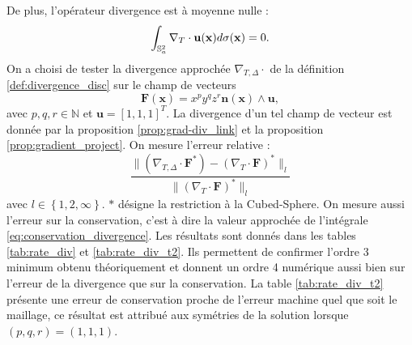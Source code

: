 De plus, l'opérateur divergence est à moyenne nulle :
\begin{equation}
\displaystyle\int_{\mathbb{S}_a^2} \nabla_T \cdot \mathbf{u} ( \mathbf{x} ) d \sigma ( \mathbf{x} ) = 0.
\label{eq:conservation_divergence}
\end{equation}
On a choisi de tester la divergence approchée $\nabla_{T,\Delta} \cdot$ de la définition \ref{def:divergence_disc} sur le champ de vecteurs 
\begin{equation}
\mathbf{F}(\mathbf{x}) = x^p y^q z^r \mathbf{n}(\mathbf{x}) \wedge \mathbf{u},
\label{eq:test_divergence}
\end{equation}
avec $p,q,r \in \mathbb{N}$ et $\mathbf{u} = [1, 1, 1]^T$. La divergence d'un tel champ de vecteur est donnée par la proposition \ref{prop:grad-div_link} et la proposition \ref{prop:gradient_project}. 
On mesure l'erreur relative : 
\begin{equation}
\dfrac{\| \left(\nabla_{T,\Delta} \cdot \mathbf{F}^* \right) - \left( \nabla_{T} \cdot \mathbf{F}\right)^* \|_l}{\| \left( \nabla_{T} \cdot \mathbf{F} \right)^* \|_l}
\end{equation}
avec $l \in \left\lbrace 1, 2, \infty \right\rbrace$. $*$ désigne la restriction à la Cubed-Sphere.
On mesure aussi l'erreur sur la conservation, c'est à dire la valeur approchée de l'intégrale \eqref{eq:conservation_divergence}. Les résultats sont donnés dans les tables \ref{tab:rate_div} et \ref{tab:rate_div_t2}. Ils permettent de confirmer l'ordre 3 minimum obtenu théoriquement et donnent un ordre 4 numérique aussi bien sur l'erreur de la divergence que sur la conservation. La table \ref{tab:rate_div_t2} présente une erreur de conservation proche de l'erreur machine quel que soit le maillage, ce résultat est attribué aux symétries de la solution lorsque $(p,q,r)=(1,1,1)$. 
